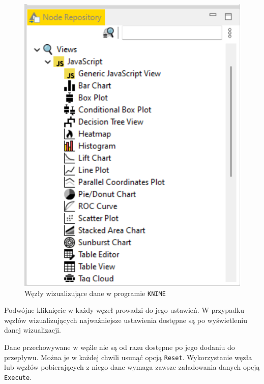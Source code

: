 \documentclass[11pt]{report}
\begin{document}
\begin{figure}[h]
    \centering
    \includegraphics[width=.6\textwidth]{wezly_wizualizujace.png}
    \caption{Węzły wizualizujące dane w programie \texttt{KNIME}\label{fig:wezly_wizualizujace}}
\end{figure}

Podwójne kliknięcie w każdy węzeł prowadzi do jego ustawień. W przypadku węzłów wizualizujących najważniejsze ustawienia dostępne są po wyświetleniu danej wizualizacji.

Dane przechowywane w węźle nie są od razu dostępne po jego dodaniu do przepływu. Można je w każdej chwili usunąć opcją \texttt{Reset}. Wykorzystanie węzła lub węzłów pobierających z niego dane wymaga zawsze załadowania danych opcją \texttt{Execute}.


\printbibliography[heading=subbibliography,title={Strony internetowe},keyword=www]
\end{document}
